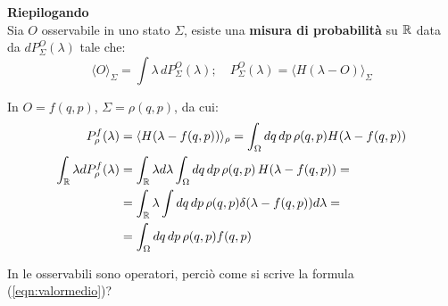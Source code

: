 \documentclass[FisicaTeorica.tex]{subfiles}
\begin{document}
\textbf{Riepilogando}\\
Sia $O$ osservabile in uno stato $\Sigma$, esiste una \textbf{misura di probabilità} su $\mathbb{R}$ data da $dP_\Sigma^O\left(\lambda\right)$ tale che:
\begin{equation}
\langle O \rangle_\Sigma = \int \lambda\,dP_\Sigma^O(\lambda); \quad P_\Sigma^O(\lambda) = \langle H(\lambda-O)\rangle_\Sigma
\label{eqn:valormedio}
\end{equation}

In \textbf{\MC} $O=f(q,p)$, $\Sigma=\rho(q,p)$, da cui:
\begin{align*}
    P_\rho^f(\lambda)&=\langle H( \lambda-f(q,p)) \rangle_\rho= \int_{\Omega}{dq\, dp\,\rho(q,p)H(\lambda-f(q,p))}\\
    \int_{\mathbb{R}} \lambda dP_\rho^f (\lambda) &= \int_{\mathbb{R}} \lambda d\lambda \int_\Omega dq\,dp\,\rho(q,p)\, H(\lambda-f(q,p)) = \\
    &= \int_{\mathbb{R}} \lambda \int dq\,dp\,\rho(q,p) \delta(\lambda-f(q,p))d\lambda = \\
    &= \int_\Omega dq\, dp\, \rho(q,p) f(q,p)
\end{align*}

\begin{question}
In \textbf{\MQ} le osservabili sono operatori, perciò come si scrive la formula (\ref{eqn:valormedio})?
\label{q:prob-mq}
\end{question}
\end{document}
